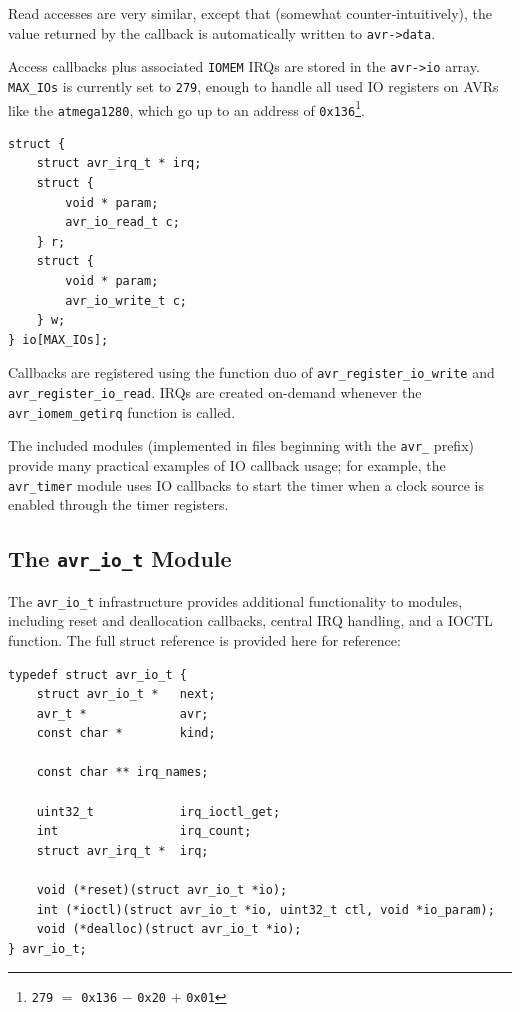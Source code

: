 Read accesses are very similar, except that (somewhat counter-intuitively), the value returned
by the callback is automatically written to \lstinline|avr->data|.

Access callbacks plus associated \lstinline|IOMEM| \acp{IRQ} are stored
in the \lstinline|avr->io| array. \lstinline|MAX_IOs| is currently set to
\lstinline|279|, enough to handle all used \ac{IO} registers on \acp{AVR} like
the \verb|atmega1280|, which go up to an address of \lstinline|0x136|\footnote{
\lstinline|279| $=$ \lstinline|0x136| $-$ \lstinline|0x20| $+$ \lstinline|0x01|}.

\begin{lstlisting}
struct {
    struct avr_irq_t * irq;
    struct {
        void * param;
        avr_io_read_t c;
    } r;
    struct {
        void * param;
        avr_io_write_t c;
    } w;
} io[MAX_IOs];
\end{lstlisting}

Callbacks are registered using the function duo of \lstinline|avr_register_io_write|
and \lstinline|avr_register_io_read|. \acp{IRQ} are created on-demand whenever
the \lstinline|avr_iomem_getirq| function is called.

The included \simavr modules (implemented in files beginning with the \verb|avr_| prefix)
provide many practical examples of \ac{IO} callback usage; for example,
the \verb|avr_timer| module uses \ac{IO} callbacks to start the timer when
a clock source is enabled through the timer registers.

\subsection{The \lstinline|avr_io_t| Module} \label{subsection:avr_io_t}

The \lstinline|avr_io_t| infrastructure provides additional functionality to
modules, including reset and deallocation callbacks, central \ac{IRQ} handling,
and a \ac{IOCTL} function. The full struct reference is provided here for reference:

\begin{lstlisting}
typedef struct avr_io_t {
    struct avr_io_t *   next;
    avr_t *             avr;
    const char *        kind;

    const char ** irq_names;

    uint32_t            irq_ioctl_get;
    int                 irq_count;
    struct avr_irq_t *  irq;

    void (*reset)(struct avr_io_t *io);
    int (*ioctl)(struct avr_io_t *io, uint32_t ctl, void *io_param);
    void (*dealloc)(struct avr_io_t *io);
} avr_io_t;
\end{lstlisting}

